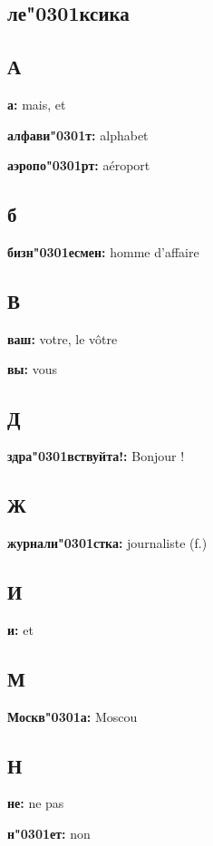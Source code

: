 \documentclass[a5paper, 10pt]{article}
\title{\vskip -4em\bf\Huge\headingfont Русский}
\date{}
\newcommand{\лекси}[2]{{\textbf{#1: }{#2}\par}}
\newcommand{\ак}[0]{\char"0301} %
\begin{document}
\maketitle

\begin{multicols}{2}
  \section*{ле\ак ксика}
  \subsection*{А}
  
  \лекси{а}{mais, et}
  \лекси{алфави\ак т}{alphabet}
  \лекси{аэропо\ак рт}{aéroport}

  \subsection*{б}
  \лекси{бизн\ак есмен}{homme d'affaire}
  
  \subsection*{В}
  \лекси{ваш}{votre, le vôtre}
  \лекси{вы}{vous}
  
  
  \subsection*{Д}
  
  \лекси{здра\ак вствуйта!}{Bonjour !}

\subsection*{Ж}
  \лекси{журнали\ак стка}{journaliste (f.)}
  \subsection*{И}

  \лекси{и}{et}
  
  \subsection*{М}
  
  \лекси{Москв\ак а}{Moscou}

  \subsection*{Н}
  \лекси{не}{ne pas}
  \лекси{н\ак ет}{non}
  

\end{multicols}
\end{document}
